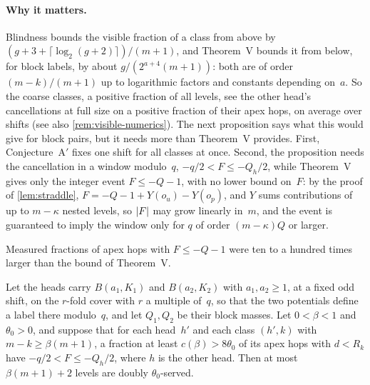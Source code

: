 \paragraph{Why it matters.} Blindness bounds the visible fraction of a class from above by
$(g+3+\lceil\log_2(g+2)\rceil)/(m+1)$, and Theorem~V bounds it from below, for block labels, by about $g/(2^{a+4}(m+1))$:
both are of order $(m-k)/(m+1)$ up to logarithmic factors and constants depending on~$a$. So the coarse classes, a positive
fraction of all levels, see the other head's cancellations at full size on a positive fraction of their apex hops, on
average over shifts (see also \cref{rem:visible-numerics}). The next proposition says what this would give for block pairs,
but it needs more than Theorem~V provides. First, Conjecture~A$'$ fixes one shift for all classes at once. Second, the
proposition needs the cancellation in a window modulo~$q$, $-q/2<F\le-Q_h/2$, while Theorem~V gives only the integer event
$F\le-Q-1$, with no lower bound on~$F$: by the proof of \cref{lem:straddle}, $F=-Q-1+Y(o_u)-Y(o_p)$, and $Y$ sums
contributions of up to $m-\kappa$ nested levels, so $\lvert F \rvert$ may grow linearly in~$m$, and the event is guaranteed to imply the
window only for $q$ of order $(m-\kappa)Q$ or larger.

\begin{remark}\label{rem:visible-numerics}
Measured fractions of apex hops with $F\le-Q-1$ were ten to a hundred times larger than the bound of Theorem~V.
\end{remark}

\begin{proposition}\label{prop:Vfixed}
\notformalized
Let the heads carry $B(a_1,K_1)$ and $B(a_2,K_2)$ with $a_1,a_2\ge1$, at a fixed odd shift, on the $r$-fold cover with $r$
a multiple of~$q$, so that the two potentials define a label there modulo~$q$, and let $Q_1,Q_2$ be their block masses. Let $0<\beta<1$ and $\theta_0>0$, and suppose that for each head~$h'$ and each class
$(h',k)$ with $m-k\ge\beta(m+1)$, a fraction at least $c(\beta)>8\theta_0$ of its apex hops with $d<R_k$ have
$-q/2<F\le-Q_h/2$, where $h$ is the other head. Then at most $\beta(m+1)+2$ levels are doubly $\theta_0$-served.
\end{proposition}

